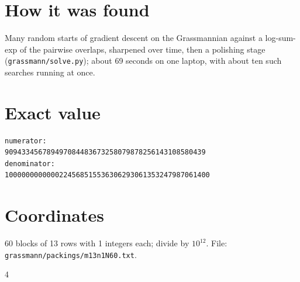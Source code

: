 \documentclass[11pt,a4paper]{article}
\begin{document}
\section{How it was found}
Many random starts of gradient descent on the Grassmannian against a log-sum-exp of the pairwise overlaps, sharpened over time, then a polishing stage (\texttt{grassmann/solve.py}); about 69 seconds on one laptop, with about ten such searches running at once.


\appendix
\section{Exact value}
{\small
\begin{verbatim}
numerator:
909433456789497084483673258079878256143108580439
denominator:
1000000000000224568515536306293061353247987061400
\end{verbatim}}

\section{Coordinates}
60 blocks of 13 rows with 1 integers each; divide by $10^{12}$. File: \texttt{grassmann/packings/m13n1N60.txt}.
{\tiny
\begin{multicols}{4}
\end{multicols}}
\end{document}
